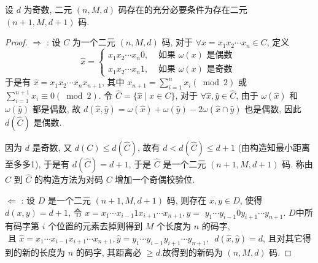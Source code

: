 \begin{theorem}
    设 $ d $ 为奇数, 二元 $ (n, M, d) $ 码存在的充分必要条件为存在二元 $ (n+1, M, d+1) $ 码.
\end{theorem}
\begin{proof}
     $ \Rightarrow $ : 设 $ C $ 为一个二元 $ (n, M, d) $ 码, 对于 $ \forall x=x_{1} x_{2} \cdots x_{n} \in C $, 定义 $$ \widehat{x}=\left\{\begin{array}{ll}x_{1} x_{2} \cdots x_{n} 0, & \text { 如果 } \omega(x) \text { 是偶数 } \\ x_{1} x_{2} \cdots x_{n} 1, & \text { 如果 } \omega(x) \text { 是奇数 }\end{array}\right. $$
     于是有 $ \widehat{x}=x_{1} x_{2} \cdots x_{n} x_{n+1} $, 其中
$ x_{n+1}=\sum\limits_{i=1}^{n} x_{i}(\bmod 2) $ 或 $ \sum\limits_{i=1}^{n+1} x_{i} \equiv 0(\bmod 2) $. 令 $ \widehat{C}=\{\widehat{x} \mid x \in C\} $, 对于 $ \forall \widehat{x}, \widehat{y} \in \widehat{C} $, 由于 $ \omega(\widehat{x}) $ 和 $ \omega(\widehat{y}) $ 都是偶数, 故 $ d(\widehat{x}, \widehat{y})=\omega(\widehat{x})+\omega(\widehat{y})-2 \omega(\widehat{x} \cap \widehat{y}) $ 也是偶数, 因此 $ d(\widehat{C}) $ 是偶数.

因为 $ d $ 是奇数, 又 $ d(C) \leq d(\widehat{C}) $, 故有 $ d<d(\widehat{C}) \leq d+1 $ (由构造知最小距离至多多1), 于是有 $ d(\widehat{C})=d+1 $, 于是 $ \widehat{C} $ 是一个二元 $ (n+1, M, d+1) $ 码. 称由 $ C $ 到 $ \widehat{C} $ 的构造方法为对码 $ C $ 增加一个奇偶校验位.

$ \Leftarrow $ : 设 $ D $ 是一个二元 $ (n+1, M, d+1) $ 码, 则存在 $ x, y \in D $, 使得 $ d(x, y)=d+1 $, 令 $ x=x_{1} \cdots x_{i-1} 1 x_{i+1} \cdots x_{n+1}, y= $ $ y_{1} \cdots y_{i-1} 0 y_{i+1} \cdots y_{n+1} $. $D$中所有码字第 $ i $ 个位置的元素去掉则得到 $ M $ 个长度为 $ n $ 的码字, $\text { 且 } \widehat{x}=x_{1} \cdots x_{i-1} x_{i+1} \cdots x_{n+1}, \widehat{y}=y_{1} \cdots y_{i-1} y_{i+1} \cdots y_{n+1} \text {, }$
$ d(\widehat{x}, \widehat{y})=d $, 且对其它得到的新的长度为 $ n $ 的码字, 其距离必 $ \geq d $.故得到的新码为 $ (n, M, d) $ 码.
\end{proof}

